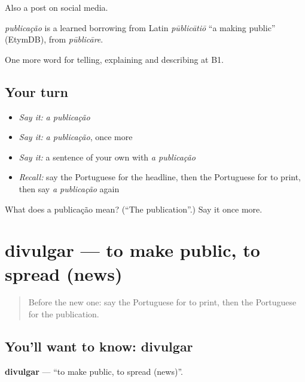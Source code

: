 Also a post on social media.

\begin{cousinweb}
\emph{publicação} is a learned borrowing from Latin \emph{pūblicātiō} \textquotedblleft{}a making public\textquotedblright{} (EtymDB), from \emph{pūblicāre}.
\end{cousinweb}

\begin{grammarlens}[title={What you've built}]
One more word for telling, explaining and describing at B1.
\end{grammarlens}

\subsection*{Your turn}
\begin{itemize}
\raggedright
  \item \emph{Say it:} \emph{a publicação}
  \item \emph{Say it:} \emph{a publicação}, once more
  \item \emph{Say it:} a sentence of your own with \emph{a publicação}
  \item \emph{Recall:} say the Portuguese for the headline, then the Portuguese for to print, then say \emph{a publicação} again
\end{itemize}

\begin{tcolorbox}[breakable,colback=teal!4,colframe=teal!35!black,title={Before you move on}]
What does a publicação mean? (\textquotedblleft{}The publication\textquotedblright{}.) Say it once more.
\end{tcolorbox}
\section[divulgar]{divulgar — to make public, to spread (news)}

\label{lesson:PT-C280-divulgar}



\begin{quote}
Before the new one: say the Portuguese for to print, then the Portuguese for the publication.
\end{quote}

\subsection*{You'll want to know: divulgar}
\textbf{divulgar} — \textquotedblleft{}to make public, to spread (news)\textquotedblright{}.

